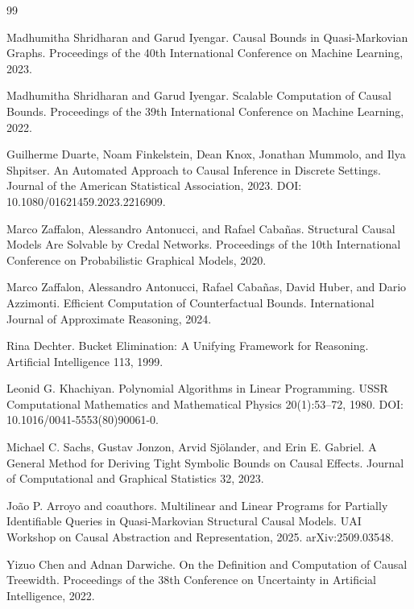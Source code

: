\documentclass{article}
\begin{document}
\begin{thebibliography}{99}

   Madhumitha Shridharan and Garud Iyengar. Causal Bounds in Quasi-Markovian Graphs. Proceedings of the 40th International Conference on Machine Learning, 2023.

   Madhumitha Shridharan and Garud Iyengar. Scalable Computation of Causal Bounds. Proceedings of the 39th International Conference on Machine Learning, 2022.

   Guilherme Duarte, Noam Finkelstein, Dean Knox, Jonathan Mummolo, and Ilya Shpitser. An Automated Approach to Causal Inference in Discrete Settings. Journal of the American Statistical Association, 2023. DOI: 10.1080/01621459.2023.2216909.

   Marco Zaffalon, Alessandro Antonucci, and Rafael Cabañas. Structural Causal Models Are Solvable by Credal Networks. Proceedings of the 10th International Conference on Probabilistic Graphical Models, 2020.

   Marco Zaffalon, Alessandro Antonucci, Rafael Cabañas, David Huber, and Dario Azzimonti. Efficient Computation of Counterfactual Bounds. International Journal of Approximate Reasoning, 2024.

   Rina Dechter. Bucket Elimination: A Unifying Framework for Reasoning. Artificial Intelligence 113, 1999.

   Leonid G. Khachiyan. Polynomial Algorithms in Linear Programming. USSR Computational Mathematics and Mathematical Physics 20(1):53–72, 1980. DOI: 10.1016/0041-5553(80)90061-0.

   Michael C. Sachs, Gustav Jonzon, Arvid Sjölander, and Erin E. Gabriel. A General Method for Deriving Tight Symbolic Bounds on Causal Effects. Journal of Computational and Graphical Statistics 32, 2023.

   João P. Arroyo and coauthors. Multilinear and Linear Programs for Partially Identifiable Queries in Quasi-Markovian Structural Causal Models. UAI Workshop on Causal Abstraction and Representation, 2025. arXiv:2509.03548.

   Yizuo Chen and Adnan Darwiche. On the Definition and Computation of Causal Treewidth. Proceedings of the 38th Conference on Uncertainty in Artificial Intelligence, 2022.


\end{thebibliography}
\end{document}
